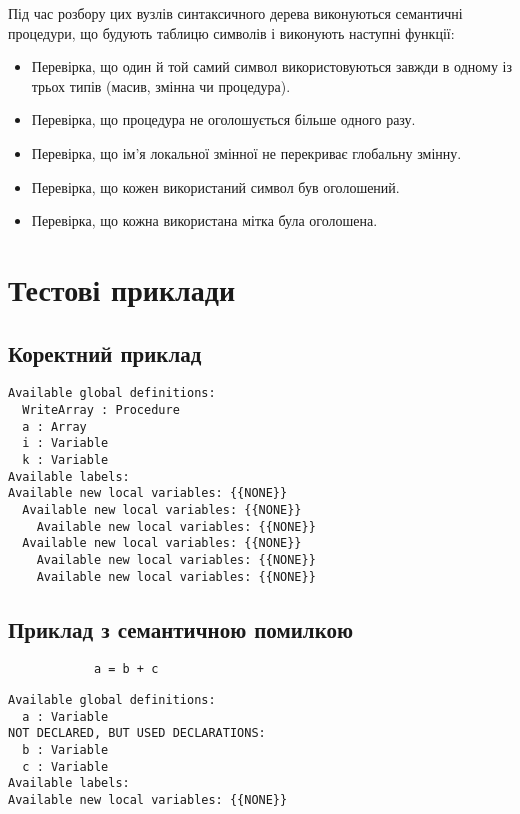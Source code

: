 \documentclass[a4paper,12pt,notitlepage,pdftex]{scrreprt}
\begin{document}
    Під час розбору цих вузлів синтаксичного дерева виконуються семантичні процедури, що будують таблицю символів і
    виконують наступні функції:
    \begin{itemize}
        \item Перевірка, що один й той самий символ використовуються завжди в одному із трьох типів (масив, змінна чи
            процедура).
        \item Перевірка, що процедура не оголошується більше одного разу.
        \item Перевірка, що ім’я локальної змінної не перекриває глобальну змінну.
        \item Перевірка, що кожен використаний символ був оголошений.
        \item Перевірка, що кожна використана мітка була оголошена.
    \end{itemize}
\chapter{Тестові приклади}
\label{chap:fourth}
    \section{Коректний приклад}
    \label{sec:ex1}
        
        \begin{verbatim}
Available global definitions:
  WriteArray : Procedure
  a : Array
  i : Variable
  k : Variable
Available labels:
Available new local variables: {{NONE}}
  Available new local variables: {{NONE}}
    Available new local variables: {{NONE}}
  Available new local variables: {{NONE}}
    Available new local variables: {{NONE}}
    Available new local variables: {{NONE}}
\end{verbatim}

    \section{Приклад з семантичною помилкою}
    \label{sec:ex2}
        \begin{lstlisting}
            a = b + c
        \end{lstlisting}
        \begin{verbatim}
Available global definitions:
  a : Variable
NOT DECLARED, BUT USED DECLARATIONS:
  b : Variable
  c : Variable
Available labels:
Available new local variables: {{NONE}}
\end{verbatim}
\end{document}
